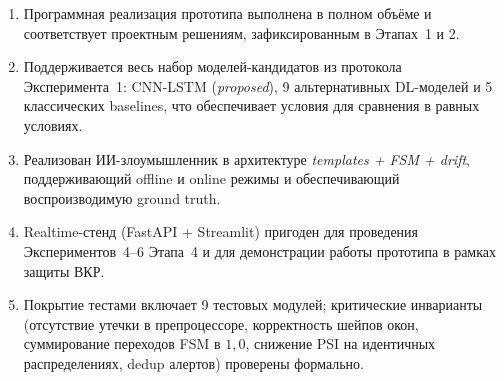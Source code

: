 \documentclass[14pt, a4paper]{extarticle}
\begin{document}
\begin{enumerate}
    \item Программная реализация прототипа выполнена в полном объёме и
    соответствует проектным решениям, зафиксированным в Этапах~1 и 2.
    \item Поддерживается весь набор моделей-кандидатов из протокола
    Эксперимента~1: CNN-LSTM (\emph{proposed}), 9 альтернативных DL-моделей
    и 5 классических baselines, что обеспечивает условия для сравнения в
    равных условиях.
    \item Реализован ИИ-злоумышленник в архитектуре \emph{templates +
    FSM + drift}, поддерживающий offline и online режимы и обеспечивающий
    воспроизводимую ground truth.
    \item Realtime-стенд (FastAPI + Streamlit) пригоден для проведения
    Экспериментов~4--6 Этапа~4 и для демонстрации работы прототипа в
    рамках защиты ВКР.
    \item Покрытие тестами включает 9 тестовых модулей; критические
    инварианты (отсутствие утечки в препроцессоре, корректность шейпов
    окон, суммирование переходов FSM в \(1{,}0\), снижение PSI на
    идентичных распределениях, dedup алертов) проверены формально.
\end{enumerate}

\printbibliography[title={СПИСОК ИСПОЛЬЗОВАННЫХ ИСТОЧНИКОВ}]

\label{LastPage}
\end{document}
